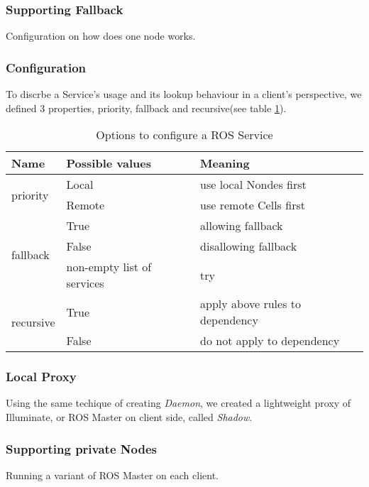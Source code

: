 \subsubsection{Supporting Fallback}
Configuration on how does one node works. 

\subsubsection{Configuration}
To discrbe a Service's usage and its lookup behaviour in a client's perspective, we defined 3 properties, priority, fallback and recursive(see table \ref{table:srv-opt}).

\begin{table}
  \renewcommand{\arraystretch}{1.3}
  \caption{Options to configure a ROS Service}
  \label{table:srv-opt}
  \centering
  \begin{tabular}{|l|l|l|}
    \hline
    \bfseries Name & \bfseries Possible values & \bfseries Meaning \\
    \hline
    \multirow{2}{*}{priority}  & Local  & use local Nondes first \\
    \cline{2-3}
                               & Remote & use remote Cells first \\
    \hline
    \multirow{3}{*}{fallback}  & True   & allowing fallback \\
    \cline{2-3}
                               & False  & disallowing fallback \\
    \cline{2-3}
                               & non-empty list of services & try  \\
    \hline
    \multirow{2}{*}{recursive} & True   & apply above rules to dependency \\
    \cline{2-3}
                               & False  & do not apply to dependency \\
    \hline
  \end{tabular}
\end{table} 

\subsubsection{Local Proxy}
Using the same techique of creating \emph{Daemon}, we created a lightweight
proxy of Illuminate, or ROS Master on client side, called \emph{Shadow}.

\subsubsection{Supporting private Nodes}
Running a variant of ROS Master on each client.


